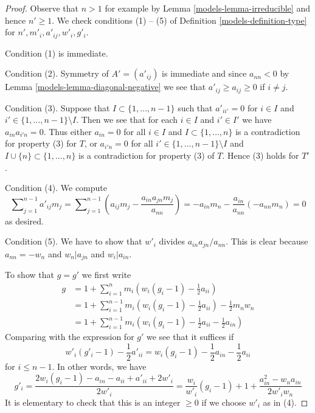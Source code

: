 \begin{proof}

Observe that $n > 1$ for example by Lemma \ref{models-lemma-irreducible}
and hence $n' \geq 1$. We check conditions (1) -- (5) of
Definition \ref{models-definition-type} for $n', m'_i, a'_{ij}, w'_i, g'_i$.

\medskip\noindent
Condition (1) is immediate.

\medskip\noindent
Condition (2). Symmetry of $A' = (a'_{ij})$ is immediate
and since $a_{nn} < 0$ by Lemma \ref{models-lemma-diagonal-negative}
we see that $a'_{ij} \geq a_{ij} \geq 0$ if $i \not = j$.

\medskip\noindent
Condition (3). Suppose that $I \subset \{1, \ldots, n - 1\}$ such that
$a'_{ii'} = 0$ for $i \in I$ and $i' \in \{1, \ldots, n - 1\} \setminus I$.
Then we see that for each $i \in I$ and $i' \in I'$ we have
$a_{in}a_{i'n} = 0$. Thus either $a_{in} = 0$ for all $i \in I$ and
$I \subset \{1, \ldots, n\}$ is a contradiction for property (3) for $T$,
or $a_{i'n} = 0$ for all $i' \in \{1, \ldots, n - 1\} \setminus I$
and $I \cup \{n\} \subset \{1, \ldots, n\}$ is a contradiction for
property (3) of $T$. Hence (3) holds for $T'$.

\medskip\noindent
Condition (4). We compute
$$
\sum\nolimits_{j = 1}^{n - 1} a'_{ij}m_j =
\sum\nolimits_{j = 1}^{n - 1}
(a_{ij}m_j - \frac{a_{in}a_{jn}m_j}{a_{nn}}) =
- a_{in}m_n - \frac{a_{in}}{a_{nn}}(-a_{nn}m_n) = 0
$$
as desired.

\medskip\noindent
Condition (5). We have to show that $w'_i$ divides $a_{in}a_{jn}/a_{nn}$.
This is clear because $a_{nn} = -w_n$ and $w_n | a_{jn}$ and $w_i | a_{in}$.

\medskip\noindent
To show that $g = g'$ we first write
\begin{align*}
g
& =
1 + \sum\nolimits_{i = 1}^n m_i(w_i(g_i - 1) - \frac{1}{2}a_{ii}) \\
& =
1 + \sum\nolimits_{i = 1}^{n - 1} m_i(w_i(g_i - 1) - \frac{1}{2}a_{ii})
-\frac{1}{2}m_nw_n \\
& =
1 +  \sum\nolimits_{i = 1}^{n - 1}
m_i(w_i(g_i - 1) - \frac{1}{2}a_{ii} - \frac{1}{2}a_{in})
\end{align*}
Comparing with the expression for $g'$ we see that it suffices if
$$
w'_i(g'_i - 1) - \frac{1}{2}a'_{ii} =
w_i(g_i - 1) - \frac{1}{2}a_{in} - \frac{1}{2}a_{ii}
$$
for $i \leq n - 1$. In other words, we have
$$
g'_i = \frac{2w_i(g_i - 1) - a_{in} - a_{ii} + a'_{ii} + 2w'_i}{2w'_i} =
\frac{w_i}{w'_i}(g_i - 1) + 1 + \frac{a_{in}^2 - w_na_{in}}{2w'_iw_n}
$$
It is elementary to check that this is an integer $\geq 0$
if we choose $w'_i$ as in (4).
\end{proof}

